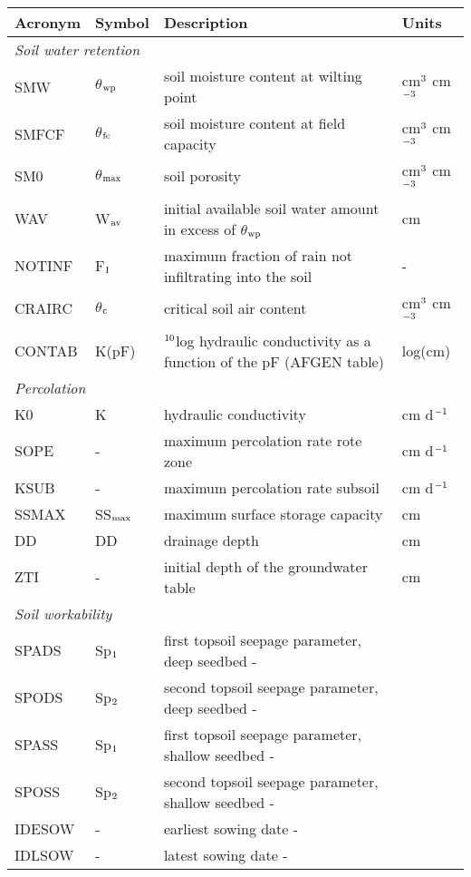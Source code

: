 \begin{longtable}[c]{llll}
\hline \hline
\textbf{Acronym} & \textbf{Symbol} & \textbf{Description} & \textbf{Units}\\
\hline

\multicolumn{4}{l}{\textit{Soil water retention}}\\   
SMW & $\theta$$_{{\rm wp}}$ & soil moisture content at wilting point    &
   cm$^{{\rm 3}}$ cm$^{{\rm -3}}$\\
SMFCF & $\theta$$_{{\rm fc}}$ & soil moisture content at field capacity   &
   cm$^{{\rm 3}}$ cm$^{{\rm -3}}$\\
SM0 & $\theta$$_{{\rm max}}$ & soil porosity   &    cm$^{{\rm 3}}$ cm$^{{\rm -3}}$\\
WAV & W$_{{\rm av}}$ & initial available soil water amount in excess of 
   $\theta$$_{{\rm wp}}$   &    cm\\
NOTINF & F$_{{\rm I}}$ & maximum fraction of rain not infiltrating into the 
   soil   &    -\\
CRAIRC & $\theta$$_{{\rm c}}$ & critical soil air content    &
   cm$^{{\rm 3}}$ cm$^{{\rm -3}}$\\
CONTAB & K(pF) & $^{{\rm 10}}$log hydraulic conductivity as a function of the pF 
(AFGEN table)   &    log(cm)\\

\multicolumn{4}{l}{\textit{Percolation}}\\   
K0 & K & hydraulic conductivity   &    cm d$^{{\rm -1}}$\\
SOPE & - & maximum percolation rate rote zone   &    cm d$^{{\rm -1}}$\\
KSUB & - & maximum percolation rate subsoil   &    cm d$^{{\rm -1}}$\\
SSMAX & SS$_{{\rm max}}$ & maximum surface storage capacity   &    cm\\
DD & DD & drainage depth   &    cm\\
ZTI & - & initial depth of the groundwater table   &    cm\\

\multicolumn{4}{l}{\textit{Soil workability}}\\   
SPADS & Sp$_{{\rm 1}}$ & first topsoil seepage parameter, deep seedbed       -\\
SPODS & Sp$_{{\rm 2}}$ & second topsoil seepage parameter, deep seedbed       -\\
SPASS & Sp$_{{\rm 1}}$ & first topsoil seepage parameter, shallow seedbed       -\\
SPOSS & Sp$_{{\rm 2}}$ & second topsoil seepage parameter, shallow seedbed       -\\
IDESOW & - & earliest sowing date       -\\
IDLSOW & - & latest sowing date       -\\

\hline \hline

\end{longtable}
